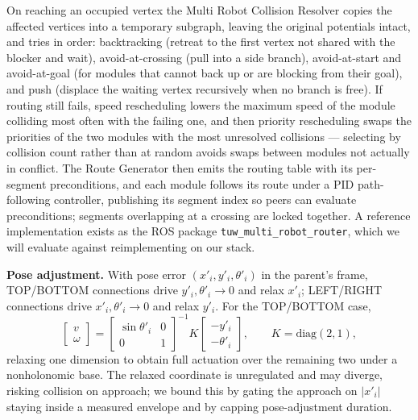 \documentclass[11pt,a4paper]{article}
\begin{document}
On reaching an occupied vertex the Multi Robot Collision Resolver copies the
affected vertices into a temporary subgraph, leaving the original potentials
intact, and tries in order: backtracking (retreat to the first vertex not
shared with the blocker and wait), avoid-at-crossing (pull into a side branch),
avoid-at-start and avoid-at-goal (for modules that cannot back up or are
blocking from their goal), and push (displace the waiting vertex recursively
when no branch is free). If routing still fails, speed rescheduling lowers the
maximum speed of the module colliding most often with the failing one, and then
priority rescheduling swaps the priorities of the two modules with the most
unresolved collisions --- selecting by collision count rather than at random
avoids swaps between modules not actually in conflict. The Route Generator then
emits the routing table with its per-segment preconditions, and each module
follows its route under a PID path-following controller, publishing its segment
index so peers can evaluate preconditions; segments overlapping at a crossing
are locked together. A reference implementation exists as the ROS package
\texttt{tuw\_multi\_robot\_router}, which we will evaluate against
reimplementing on our stack.

\medskip
\noindent\textbf{Pose adjustment.} With pose error
$(x'_i, y'_i, \theta'_i)$ in the parent's frame, TOP/BOTTOM connections drive
$y'_i, \theta'_i \rightarrow 0$ and relax $x'_i$; LEFT/RIGHT connections drive
$x'_i, \theta'_i \rightarrow 0$ and relax $y'_i$. For the TOP/BOTTOM case,
\begin{equation}
  \begin{bmatrix} v \\ \omega \end{bmatrix}
  = \begin{bmatrix} \sin\theta'_i & 0 \\ 0 & 1 \end{bmatrix}^{-1}
    K \begin{bmatrix} -y'_i \\ -\theta'_i \end{bmatrix},
  \qquad K = \mathrm{diag}(2, 1),
\end{equation}
relaxing one dimension to obtain full actuation over the remaining two under a
nonholonomic base. The relaxed coordinate is unregulated and may diverge,
risking collision on approach; we bound this by gating the approach on
$|x'_i|$ staying inside a measured envelope and by capping pose-adjustment
duration.
\end{document}
